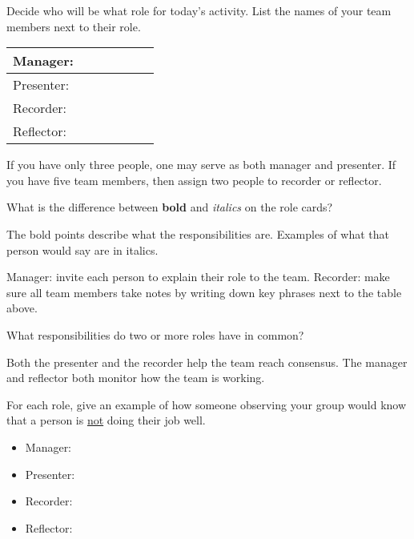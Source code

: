 
Decide who will be what role for today's activity. List the names of your team members next to their role.

\begin{table}[h!]
\renewcommand{\arraystretch}{2}
\begin{tabular}{|p{0.5\linewidth}|}
\hline
Manager: \\
\hline
Presenter: \\
\hline
Recorder: \\
\hline
Reflector: \\
\hline
\end{tabular}
\end{table}

If you have only three people, one may serve as both manager and presenter. If you have five team members, then assign two people to recorder or reflector.



\Q What is the difference between \textbf{bold} and \textit{italics} on the role cards?

\begin{answer}
The bold points describe what the responsibilities are.
Examples of what that person would say are in italics.
\end{answer}

\Q Manager: invite each person to explain their role to the team. Recorder: make sure all team members take notes by writing down key phrases next to the table above.

\vspace{2em}

\Q What responsibilities do two or more roles have in common?

\begin{answer}
Both the presenter and the recorder help the team reach consensus.
The manager and reflector both monitor how the team is working.
\end{answer}

\Q For each role, give an example of how someone observing your group would know that a person is \underline{not} doing their job well.

\begin{itemize}
\setlength\itemsep{1em}

\item Manager: ~ 

\item Presenter: ~ 

\item Recorder: ~ 

\item Reflector: ~ 

\end{itemize}
